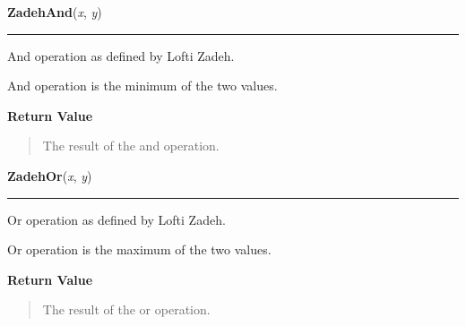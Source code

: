     \label{peach:fuzzy:norms:ZadehAnd}

    \vspace{0.5ex}

    \begin{boxedminipage}{\textwidth}

    \raggedright \textbf{ZadehAnd}(\textit{x}, \textit{y})

    \vspace{-1.5ex}

    \rule{\textwidth}{0.5\fboxrule}

And operation as defined by Lofti Zadeh.

And operation is the minimum of the two values.
    \vspace{1ex}

      \textbf{Return Value}
      \begin{quote}

The result of the and operation.
      \end{quote}

    \vspace{1ex}

    \end{boxedminipage}

    \label{peach:fuzzy:norms:ZadehOr}

    \vspace{0.5ex}

    \begin{boxedminipage}{\textwidth}

    \raggedright \textbf{ZadehOr}(\textit{x}, \textit{y})

    \vspace{-1.5ex}

    \rule{\textwidth}{0.5\fboxrule}

Or operation as defined by Lofti Zadeh.

Or operation is the maximum of the two values.
    \vspace{1ex}

      \textbf{Return Value}
      \begin{quote}

The result of the or operation.
      \end{quote}

    \vspace{1ex}

    \end{boxedminipage}

